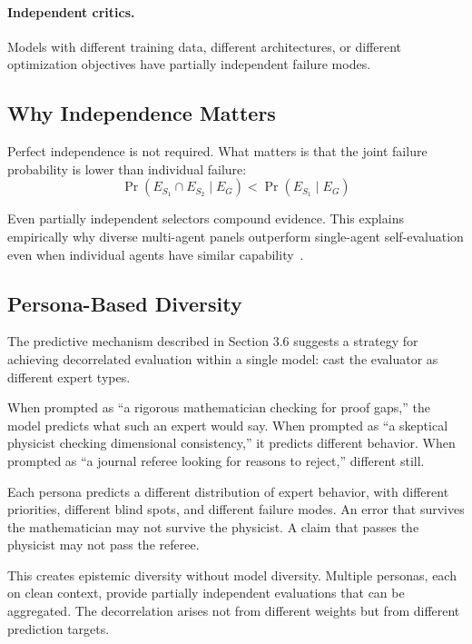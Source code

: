 \documentclass[11pt]{article}
\begin{document}
\paragraph{Independent critics.} Models with different training data, different
architectures, or different optimization objectives have partially independent failure modes.

\subsection{Why Independence Matters}

Perfect independence is not required. What matters is that the joint failure probability is
lower than individual failure:
\begin{equation}
\Pr(E_{S_1} \cap E_{S_2} \mid E_G) < \Pr(E_{S_1} \mid E_G)
\end{equation}

Even partially independent selectors compound evidence. This explains empirically why
diverse multi-agent panels outperform single-agent self-evaluation even when individual
agents have similar capability~\citep{du2023debate, liang2023debate}.

\subsection{Persona-Based Diversity}

The predictive mechanism described in Section 3.6 suggests a strategy for achieving
decorrelated evaluation within a single model: cast the evaluator as different expert types.

When prompted as ``a rigorous mathematician checking for proof gaps,'' the model predicts
what such an expert would say. When prompted as ``a skeptical physicist checking dimensional
consistency,'' it predicts different behavior. When prompted as ``a journal referee looking
for reasons to reject,'' different still.

Each persona predicts a different distribution of expert behavior, with different priorities,
different blind spots, and different failure modes. An error that survives the mathematician
may not survive the physicist. A claim that passes the physicist may not pass the referee.

This creates epistemic diversity without model diversity. Multiple personas, each on clean
context, provide partially independent evaluations that can be aggregated. The decorrelation
arises not from different weights but from different prediction targets.
\end{document}
